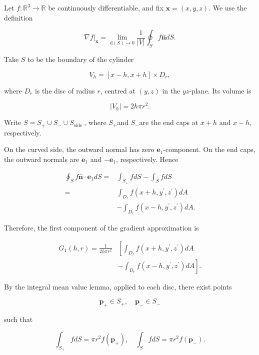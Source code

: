\begin{formalproof}
  
Let \(f: \mathbb{R}^3 \rightarrow \mathbb{R}\) be continuously differentiable, and fix \(\boldsymbol{x}=(x, y, z)\).
We use the definition

\[
\left.\nabla f\right|_{\boldsymbol{x}}=\lim _{\mathrm{d}(S) \rightarrow 0} \frac{1}{|V|} \oint_S f \hat{\boldsymbol{n}} d S .
\]

Take \(S\) to be the boundary of the cylinder

\[
V_h=[x-h, x+h] \times D_r,
\]

where \(D_r\) is the disc of radius \(r\), centred at \((y, z)\) in the \(y z\)-plane. Its volume is

\[
\left|V_h\right|=2 h \pi r^2 .
\]

Write \(S=S_{+} \cup S_{-} \cup S_{\text {side }}\), where \(S_{+}\)and \(S_{-}\)are the end caps at \(x+h\) and \(x-h\), respectively.

On the curved side, the outward normal has zero \(\boldsymbol{e}_1\)-component. On the end caps, the outward normals are \(\boldsymbol{e}_1\) and \(-\boldsymbol{e}_1\), respectively. Hence

\[
\begin{aligned}
\oint_S f \hat{\boldsymbol{n}} \cdot \boldsymbol{e}_1 d S= & \int_{S_{+}} f d S-\int_S f d S \\
= & \int_{D_r} f\left(x+h, y^{\prime}, z^{\prime}\right) d A \\
& -\int_{D_r} f\left(x-h, y^{\prime}, z^{\prime}\right) d A .
\end{aligned}
\]

Therefore, the first component of the gradient approximation is

\[
\begin{aligned}
G_1(h, r)=\frac{1}{2 h \pi r^2} & {\left[\int_{D_r} f\left(x+h, y^{\prime}, z^{\prime}\right) d A\right.} \\
& \left.-\int_{D_r} f\left(x-h, y^{\prime}, z^{\prime}\right) d A\right] .
\end{aligned}
\]

By the integral mean value lemma, applied to each disc, there exist points

\[
\boldsymbol{p}_{+} \in S_{+}, \quad \boldsymbol{p}_{-} \in S_{-}
\]

such that

\[
\int_{S_{+}} f d S=\pi r^2 f\left(\boldsymbol{p}_{+}\right), \quad \int_S f d S=\pi r^2 f\left(\boldsymbol{p}_{-}\right) .
\]


\end{formalproof}
